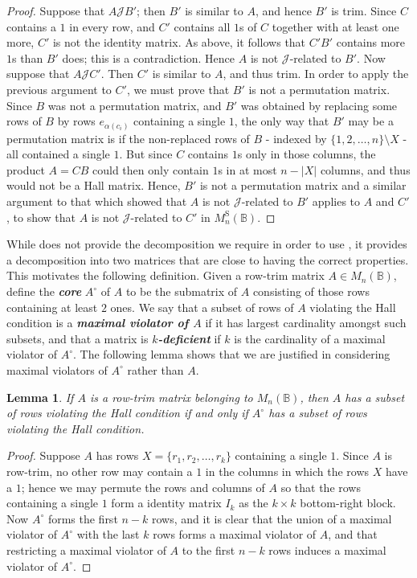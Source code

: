 \documentclass[11pt]{article}
\newtheorem{lemma}[thm]{Lemma}
\newcommand{\defn}[1]{\textbf{\textit{#1}}}
\numberwithin{equation}{section}
\newcommand{\B}{\mathbb{B}}
\newcommand{\Bn}{M_n(\B)}
\newcommand{\Halln}{M_n^{\text{S}}(\B)}
\newcommand{\J}{\mathscr{J}}
\begin{document}
\begin{proof}
  Suppose that $A \J B'$; then $B'$ is similar to $A$, and hence $B'$
  is trim. Since $C$ contains a $1$ in every row, and $C'$ contains all $1$s of
  $C$ together with at least one more, $C'$ is not the identity matrix.
  As above, it follows that $C'B'$ contains more $1$s than $B'$ does; this is a
  contradiction. Hence $A$ is not $\J$-related to $B'$. Now suppose that $A\J
  C'$. Then $C'$ is similar to $A$, and thus trim.
  In order to apply the previous argument to $C'$, we must prove that $B'$ is
  not a permutation matrix. Since $B$ was not a permutation matrix, and $B'$ was
  obtained by replacing some rows of $B$ by rows $e_{\alpha(c_i)}$ containing a
  single $1$, the only way that $B'$ may be a permutation matrix is if the
  non-replaced rows of $B$ - indexed by $\{1, 2, \ldots, n\}\setminus X$ - all
  contained a single $1$.  But since $C$ contains $1$s only in those columns,
  the product $A = CB$ could then only contain $1$s in at most $n - |X|$
  columns, and thus would not be a Hall matrix.  Hence, $B'$ is not a
  permutation matrix and a similar argument to that which showed that $A$ is not
  $\J$-related to $B'$ applies to $A$ and $C'$, to show that $A$ is not
  $\J$-related to $C'$ in $\Halln$.
\end{proof}

While  does not provide the decomposition we
require in order to use , it provides a
decomposition into two matrices that are close to having the correct properties.
This motivates the following definition. Given a row-trim matrix $A \in \Bn$,
define the \defn{core} $A^\circ$ of $A$ to be the submatrix of $A$ consisting of
those rows containing at least $2$ ones. We say that a subset of rows of $A$
violating the Hall condition is a \defn{maximal violator of $A$} if it has
largest cardinality amongst such subsets, and that a matrix is
\defn{$k$-deficient} if $k$ is the cardinality of a maximal violator of
$A^\circ$. The following lemma shows that we are justified in considering
maximal violators of $A^\circ$ rather than $A$. 

\begin{lemma}
  If $A$ is a row-trim matrix belonging to $\Bn$, then $A$ has a subset of rows
  violating the Hall condition if and only if $A^\circ$ has a subset of rows
  violating the Hall condition.
\end{lemma}
\begin{proof}
  Suppose $A$ has rows $X = \{r_1, r_2, \ldots, r_k\}$ containing a single $1$.
  Since $A$ is row-trim, no other row may contain a $1$ in the columns in which
  the rows $X$ have a $1$; hence we may permute the rows and columns of $A$ so
  that the rows containing a single $1$ form a identity matrix $I_k$ as the $k
  \times k$ bottom-right block. Now $A^\circ$ forms the first $n-k$ rows, and it
  is clear that the union of a maximal violator of $A^\circ$ with the last $k$
  rows forms a maximal violator of $A$, and that restricting a maximal violator
  of $A$ to the first $n-k$ rows induces a maximal violator of $A^\circ$.
\end{proof}
\end{document}

